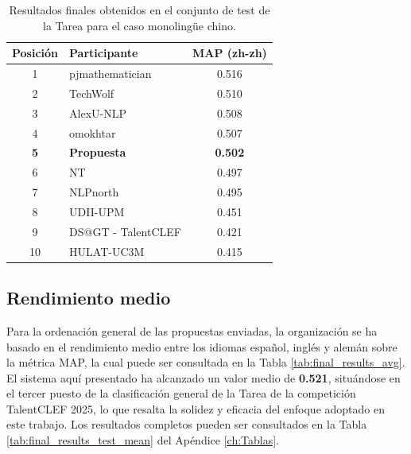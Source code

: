 \begin{table}[ht!]
    \centering
    \begin{tabular}{clc }
        \hline
        \textbf{Posición} & \textbf{Participante} & \textbf{MAP (zh-zh)} \\ \hline
        1                 & pjmathematician       & 0.516                \\ 
        2                 & TechWolf              & 0.510                \\ 
        3                 & AlexU-NLP             & 0.508                \\ 
        4                 & omokhtar              & 0.507                \\ 
        \textbf{5}        & \textbf{Propuesta}    & \textbf{0.502}       \\ 
        6                 & NT                    & 0.497                \\ 
        7                 & NLPnorth              & 0.495                \\
        8                 & UDII-UPM              & 0.451                \\
        9                 & DS@GT - TalentCLEF    & 0.421                \\
        10                & HULAT-UC3M            & 0.415                \\ \hline
    \end{tabular}
    \caption{Resultados finales obtenidos en el conjunto de test de la \gls{Tarea} para el caso monolingüe chino.}
    \label{tab:final_results_test_zh}
\end{table}

\subsection{Rendimiento medio}

\noindent Para la ordenación general de las propuestas enviadas, la organización se ha basado en el rendimiento medio entre los idiomas español, inglés y alemán sobre la métrica \gls{MAP}, la cual puede ser consultada en la Tabla \ref{tab:final_results_avg}. El sistema aquí presentado ha alcanzado un valor medio de \textbf{0.521}, situándose en el tercer puesto de la clasificación general de la \gls{Tarea} de la competición TalentCLEF 2025, lo que resalta la solidez y eficacia del enfoque adoptado en este trabajo. Los resultados completos pueden ser consultados en la Tabla \ref{tab:final_results_test_mean} del Apéndice \ref{ch:Tablas}.


